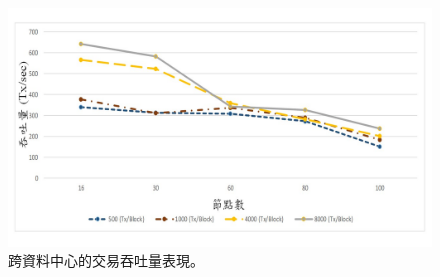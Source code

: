 \begin{figure}[htp]
\centering
\includegraphics[scale=0.5]{images/63.jpg}
\caption{跨資料中心的交易吞吐量表現。}
\label{i:byz-latency}
\end{figure}
